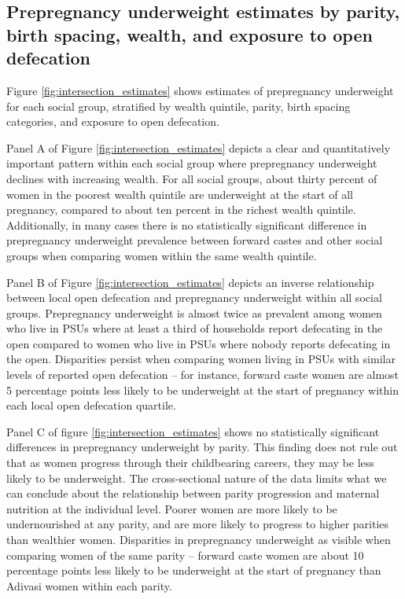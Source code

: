 \documentclass[12pt]{article}
\begin{document}
\subsection*{Prepregnancy underweight estimates by parity, birth spacing, wealth, and exposure to open defecation}

Figure \ref{fig:intersection_estimates} shows estimates of prepregnancy underweight for each social group, stratified by wealth quintile, parity, birth spacing categories, and exposure to open defecation. 

Panel A of Figure \ref{fig:intersection_estimates} depicts a clear and quantitatively important pattern within each social group where prepregnancy underweight declines with increasing wealth. For all social groups, about thirty percent of women in the poorest wealth quintile are underweight at the start of all pregnancy, compared to about ten percent in the richest wealth quintile. Additionally, in many cases there is no statistically significant difference in prepregnancy underweight prevalence between forward castes and other social groups when comparing women within the same wealth quintile.


Panel B of Figure \ref{fig:intersection_estimates} depicts an inverse relationship between local open defecation and prepregnancy underweight within all social groups. Prepregnancy underweight is almost twice as prevalent among women who live in PSUs where at least a third of households report defecating in the open compared to women who live in PSUs where nobody reports defecating in the open. Disparities persist when comparing women living in PSUs with similar levels of reported open defecation -- for instance, forward caste women are almost 5 percentage points less likely to be underweight at the start of pregnancy within each local open defecation quartile. 

Panel C of figure \ref{fig:intersection_estimates} shows no statistically significant differences in prepregnancy underweight by parity. This finding does not rule out that as women progress through their childbearing careers, they may be less likely to be underweight. The cross-sectional nature of the data limits what we can conclude about the relationship between parity progression and maternal nutrition at the individual level. Poorer women are more likely to be undernourished at any parity, and are more likely to progress to higher parities than wealthier women. Disparities in prepregnancy underweight as visible when comparing women of the same parity -- forward caste women are about 10 percentage points less likely to be underweight at the start of pregnancy than Adivasi women within each parity. 
\end{document}
